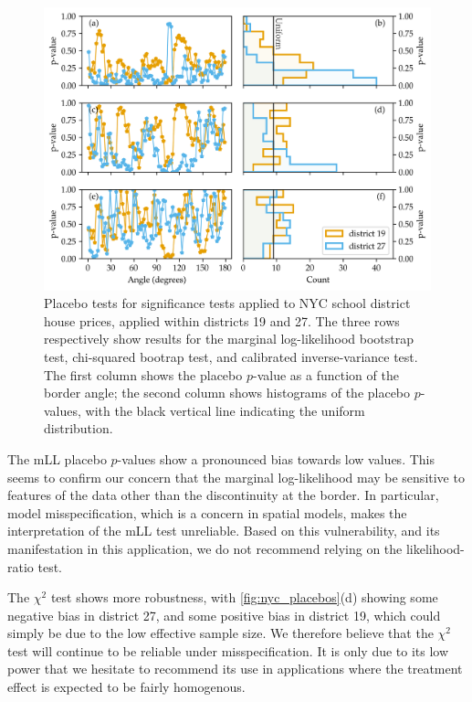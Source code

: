 \begin{figure}[tbp]
    \centering
    \includegraphics[width=\textwidth]{figures/NYC_placebos.png}
    \caption{
		\label{fig:nyc_placebos}
		Placebo tests for significance tests applied to NYC school district house prices, applied within districts 19 and 27. The three rows respectively show results for the marginal log-likelihood bootstrap test, chi-squared bootrap test, and calibrated inverse-variance test. The first column shows the placebo \(p\)-value as a function of the border angle; the second column shows histograms of the placebo \(p\)-values, with the black vertical line indicating the uniform distribution.
	}
\end{figure}

	The mLL placebo \(p\)-values show a pronounced bias towards low values.
This seems to confirm our concern that the marginal log-likelihood may be sensitive to features of the data other than the discontinuity at the border.
In particular, model misspecification, which is a concern in spatial models, makes the interpretation of the mLL test unreliable.
Based on this vulnerability, and its manifestation in this application, we do not recommend relying on the likelihood-ratio test.

	The \(\chi^2\) test shows more robustness, with \autoref{fig:nyc_placebos}(d) showing some negative bias in district 27, and some positive bias in district 19, which could simply be due to the low effective sample size.
We therefore believe that the \(\chi^2\) test will continue to be reliable under misspecification.
It is only due to its low power that we hesitate to recommend its use in applications where the treatment effect is expected to be fairly homogenous.

